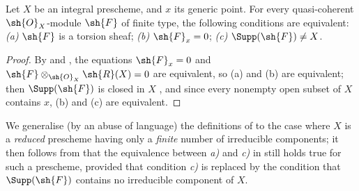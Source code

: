 \begin{proposition}[7.4.6]
\label{I.7.4.6}
Let $X$ be an integral prescheme, and $x$ its generic point.
For every quasi-coherent $\sh{O}_X$-module $\sh{F}$ of finite type, the following conditions are equivalent: \emph{(a)} $\sh{F}$ is a torsion sheaf; \emph{(b)} $\sh{F}_x=0$; \emph{(c)} $\Supp(\sh{F})\neq X$.
\end{proposition}

\begin{proof}
By  and , the equations $\sh{F}_x=0$ and $\sh{F}\otimes_{\sh{O}_X}\sh{R}(X)=0$ are equivalent, so (a) and (b) are equivalent; then $\Supp(\sh{F})$ is closed in $X$ , and since every nonempty open subset of $X$ contains $x$, (b) and (c) are equivalent.
\end{proof}

\begin{env}[7.4.7]
\label{I.7.4.7}
We generalise (by an abuse of language) the definitions of  to the case where $X$ is a \emph{reduced} prescheme having only a \emph{finite} number of irreducible components; it then follows from  that the equivalence between \emph{a)} and \emph{c)} in  still holds true for such a prescheme, provided that condition \emph{c)} is replaced by the condition that $\Supp(\sh{F})$ contains no irreducible component of $X$.
\end{env}
